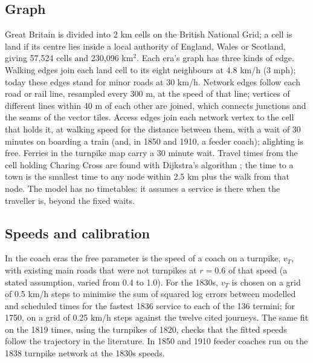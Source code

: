 \documentclass[11pt,a4paper]{article}
\begin{document}
\subsection{Graph}
Great Britain is divided into 2 km cells on the British National Grid; a cell is land if its centre lies inside a local authority of England, Wales or Scotland, giving 57,524 cells and 230,096 km$^2$. Each era's graph has three kinds of edge. Walking edges join each land cell to its eight neighbours at 4.8 km/h (3 mph); today these edges stand for minor roads at 30 km/h. Network edges follow each road or rail line, resampled every 300 m, at the speed of that line; vertices of different lines within 40 m of each other are joined, which connects junctions and the seams of the vector tiles. Access edges join each network vertex to the cell that holds it, at walking speed for the distance between them, with a wait of 30 minutes on boarding a train (and, in 1850 and 1910, a feeder coach); alighting is free. Ferries in the turnpike map carry a 30 minute wait. Travel times from the cell holding Charing Cross are found with Dijkstra's algorithm \citep{dijkstra1959}; the time to a town is the smallest time to any node within 2.5 km plus the walk from that node. The model has no timetables: it assumes a service is there when the traveller is, beyond the fixed waits.

\subsection{Speeds and calibration}
In the coach eras the free parameter is the speed of a coach on a turnpike, $v_T$, with existing main roads that were not turnpikes at $r = 0.6$ of that speed (a stated assumption, varied from 0.4 to 1.0). For the 1830s, $v_T$ is chosen on a grid of 0.5 km/h steps to minimise the sum of squared log errors between modelled and scheduled times for the fastest 1836 service to each of the 136 termini; for 1750, on a grid of 0.25 km/h steps against the twelve cited journeys. The same fit on the 1819 times, using the turnpikes of 1820, checks that the fitted speeds follow the trajectory in the literature. In 1850 and 1910 feeder coaches run on the 1838 turnpike network at the 1830s speeds.
\end{document}
